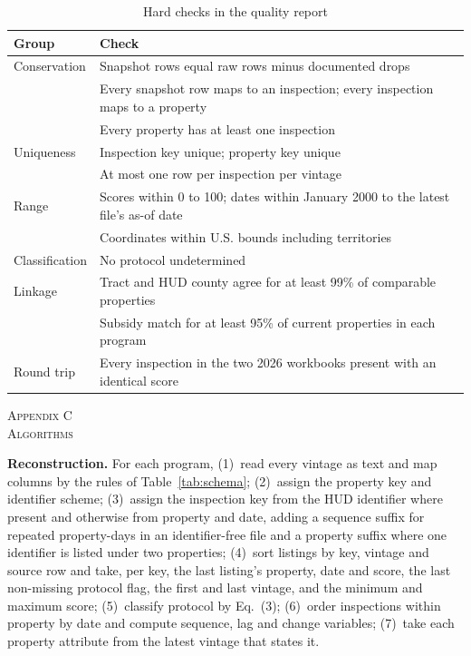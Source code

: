 \documentclass[10pt,twocolumn,letterpaper]{article}
\newcommand{\runhead}[1]{\par\vspace{0.35ex}\noindent\textbf{#1}\hspace{0.35em}}
\newcommand{\appsection}[2]{\par\vspace{2.2ex}\begin{center}\textsc{Appendix #1}\\\textsc{#2}\end{center}\vspace{0.6ex}}
\begin{document}
\begin{table}[h]
\caption{Hard checks in the quality report}\label{tab:qa}
\centering\footnotesize
\begin{tabular}{@{}lp{}@{}}
\toprule
Group & Check \\
\midrule
Conservation & Snapshot rows equal raw rows minus documented drops \\
 & Every snapshot row maps to an inspection; every inspection maps to a property \\
 & Every property has at least one inspection \\
Uniqueness & Inspection key unique; property key unique \\
 & At most one row per inspection per vintage \\
Range & Scores within 0 to 100; dates within January 2000 to the latest file's as-of date \\
 & Coordinates within U.S. bounds including territories \\
Classification & No protocol undetermined \\
Linkage & Tract and HUD county agree for at least 99\% of comparable properties \\
 & Subsidy match for at least 95\% of current properties in each program \\
Round trip & Every inspection in the two 2026 workbooks present with an identical score \\
\bottomrule
\end{tabular}
\end{table}

\appsection{C}{Algorithms}
\runhead{Reconstruction.} For each program, (1)~read every vintage as text and map columns by the rules of Table~\ref{tab:schema}; (2)~assign the property key and identifier scheme; (3)~assign the inspection key from the HUD identifier where present and otherwise from property and date, adding a sequence suffix for repeated property-days in an identifier-free file and a property suffix where one identifier is listed under two properties; (4)~sort listings by key, vintage and source row and take, per key, the last listing's property, date and score, the last non-missing protocol flag, the first and last vintage, and the minimum and maximum score; (5)~classify protocol by Eq.~(3); (6)~order inspections within property by date and compute sequence, lag and change variables; (7)~take each property attribute from the latest vintage that states it.
\end{document}
